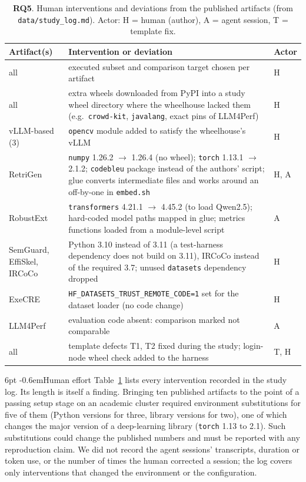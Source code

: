 \documentclass[pdflatex,sn-mathphys-num]{sn-jnl}
\makeatletter
\theoremstyle{thmstyletwo}%
\theoremstyle{thmstylethree}%
\newcommand{\code}[1]{\texttt{#1}}
\newcommand{\RQ}[1]{\textbf{RQ#1}}
\renewcommand\paragraph{\@startsection{paragraph}{4}{\z@}%
  {6pt \@plus 2pt \@minus 1pt}{-0.6em}{\normalfont\normalsize\bfseries}}
\makeatother
\begin{document}
\begin{table}[t]
\centering\small
\caption{\RQ{5}. Human interventions and deviations from the published artifacts (from \code{data/study\_log.md}). Actor: H = human (author), A = agent session, T = template fix.}\label{tab:interventions}
\begin{tabularx}{\textwidth}{@{}l >{\raggedright\arraybackslash}X l@{}}
\toprule
Artifact(s) & Intervention or deviation & Actor \\
\midrule
all & executed subset and comparison target chosen per artifact & H \\
all & extra wheels downloaded from PyPI into a study wheel directory where the wheelhouse lacked them (e.g.\ \code{crowd-kit}, \code{javalang}, exact pins of LLM4Perf) & H \\
vLLM-based (3) & \code{opencv} module added to satisfy the wheelhouse's vLLM & H \\
RetriGen & \code{numpy} 1.26.2 $\to$ 1.26.4 (no wheel); \code{torch} 1.13.1 $\to$ 2.1.2; \code{codebleu} package instead of the authors' script; glue converts intermediate files and works around an off-by-one in \code{embed.sh} & H, A \\
RobustExt & \code{transformers} 4.21.1 $\to$ 4.45.2 (to load Qwen2.5); hard-coded model paths mapped in glue; metrics functions loaded from a module-level script & A \\
SemGuard, EffiSkel, IRCoCo & Python 3.10 instead of 3.11 (a test-harness dependency does not build on 3.11), IRCoCo instead of the required 3.7; unused \code{datasets} dependency dropped & H \\
ExeCRE & \code{HF\_DATASETS\_TRUST\_REMOTE\_CODE=1} set for the dataset loader (no code change) & H \\
LLM4Perf & evaluation code absent: comparison marked not comparable & A \\
all & template defects T1, T2 fixed during the study; login-node wheel check added to the harness & T, H \\
\bottomrule
\end{tabularx}
\end{table}

\paragraph{Human effort} Table~\ref{tab:interventions} lists every intervention recorded in the study log. Its length is itself a finding. Bringing ten published artifacts to the point of a passing setup stage on an academic cluster required environment substitutions for five of them (Python versions for three, library versions for two), one of which changes the major version of a deep-learning library (\code{torch} 1.13 to 2.1). Such substitutions could change the published numbers and must be reported with any reproduction claim. We did not record the agent sessions' transcripts, duration or token use, or the number of times the human corrected a session; the log covers only interventions that changed the environment or the configuration.
\end{document}
